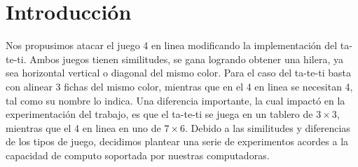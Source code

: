 \section{Introducción}

Nos propusimos atacar el juego 4 en linea modificando la implementación del ta-te-ti.
Ambos juegos tienen similitudes, se gana logrando obtener una hilera, ya sea horizontal vertical o diagonal del mismo color.
Para el caso del ta-te-ti basta con alinear 3 fichas del mismo color, mientras que en el 4 en linea se necesitan 4, tal como su nombre
lo indica. Una diferencia importante, la cual impactó en la experimentación del trabajo,
es que el ta-te-ti se juega en un tablero de $3\times3$, mientras que el 4 en linea en uno de $7\times6$.
Debido a las similitudes y diferencias de los tipos de juego, decidimos plantear una serie de experimentos acordes a la capacidad de computo soportada
por nuestras computadoras.


